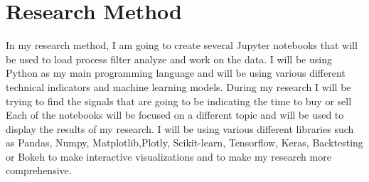 \documentclass{imc-inf}
\begin{document}
	
	
	\section{Research Method} 
	In my research method, I am going to create several Jupyter notebooks that will
	be used to load process filter analyze and work on the data. I will be using
	Python as my main programming language and will be using various different
	technical indicators and machine learning models. During my research I will be  trying to find the signals that are going to be indicating the time to buy or sell 
	Each of the notebooks will be focused on a different topic and will be used to display the results of my research. I will be using various different libraries such as
	Pandas, Numpy, Matplotlib,Plotly, Scikit-learn, Tensorflow, Keras, Backtesting or Bokeh to make interactive visualizations and to make my research more comprehensive.
	
	
	
\end{document}
